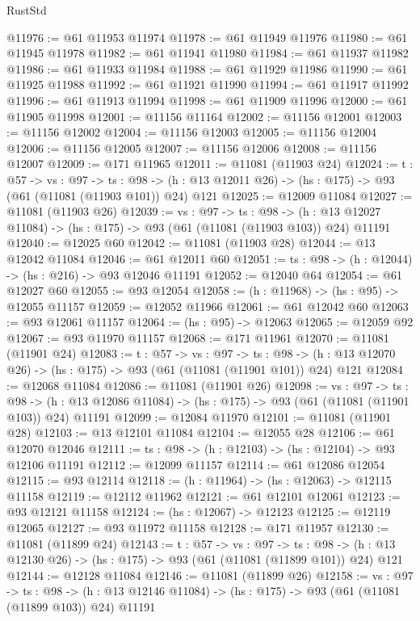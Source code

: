 \begin{lexlean}{RustStd}
\begin{coremodule}
@11976 := @61 @11953 @11974
@11978 := @61 @11949 @11976
@11980 := @61 @11945 @11978
@11982 := @61 @11941 @11980
@11984 := @61 @11937 @11982
@11986 := @61 @11933 @11984
@11988 := @61 @11929 @11986
@11990 := @61 @11925 @11988
@11992 := @61 @11921 @11990
@11994 := @61 @11917 @11992
@11996 := @61 @11913 @11994
@11998 := @61 @11909 @11996
@12000 := @61 @11905 @11998
@12001 := @11156 @11164
@12002 := @11156 @12001
@12003 := @11156 @12002
@12004 := @11156 @12003
@12005 := @11156 @12004
@12006 := @11156 @12005
@12007 := @11156 @12006
@12008 := @11156 @12007
@12009 := @171 @11965
@12011 := @11081 (@11903 @24)
@12024 := {t : @57} ->
  {vs : @97} ->
  {ts : @98} -> (h : @13 @12011 @26) -> (hs : @175) -> @93 (@61 (@11081 (@11903 @101)) @24) @121
@12025 := @12009 @11084
@12027 := @11081 (@11903 @26)
@12039 := {vs : @97} ->
  {ts : @98} ->
  (h : @13 @12027 @11084) -> (hs : @175) -> @93 (@61 (@11081 (@11903 @103)) @24) @11191
@12040 := @12025 @60
@12042 := @11081 (@11903 @28)
@12044 := @13 @12042 @11084
@12046 := @61 @12011 @60
@12051 := {ts : @98} -> (h : @12044) -> (hs : @216) -> @93 @12046 @11191
@12052 := @12040 @64
@12054 := @61 @12027 @60
@12055 := @93 @12054
@12058 := (h : @11968) -> (hs : @95) -> @12055 @11157
@12059 := @12052 @11966
@12061 := @61 @12042 @60
@12063 := @93 @12061 @11157
@12064 := (hs : @95) -> @12063
@12065 := @12059 @92
@12067 := @93 @11970 @11157
@12068 := @171 @11961
@12070 := @11081 (@11901 @24)
@12083 := {t : @57} ->
  {vs : @97} ->
  {ts : @98} -> (h : @13 @12070 @26) -> (hs : @175) -> @93 (@61 (@11081 (@11901 @101)) @24) @121
@12084 := @12068 @11084
@12086 := @11081 (@11901 @26)
@12098 := {vs : @97} ->
  {ts : @98} ->
  (h : @13 @12086 @11084) -> (hs : @175) -> @93 (@61 (@11081 (@11901 @103)) @24) @11191
@12099 := @12084 @11970
@12101 := @11081 (@11901 @28)
@12103 := @13 @12101 @11084
@12104 := @12055 @28
@12106 := @61 @12070 @12046
@12111 := {ts : @98} -> (h : @12103) -> (hs : @12104) -> @93 @12106 @11191
@12112 := @12099 @11157
@12114 := @61 @12086 @12054
@12115 := @93 @12114
@12118 := (h : @11964) -> (hs : @12063) -> @12115 @11158
@12119 := @12112 @11962
@12121 := @61 @12101 @12061
@12123 := @93 @12121 @11158
@12124 := (hs : @12067) -> @12123
@12125 := @12119 @12065
@12127 := @93 @11972 @11158
@12128 := @171 @11957
@12130 := @11081 (@11899 @24)
@12143 := {t : @57} ->
  {vs : @97} ->
  {ts : @98} -> (h : @13 @12130 @26) -> (hs : @175) -> @93 (@61 (@11081 (@11899 @101)) @24) @121
@12144 := @12128 @11084
@12146 := @11081 (@11899 @26)
@12158 := {vs : @97} ->
  {ts : @98} ->
  (h : @13 @12146 @11084) -> (hs : @175) -> @93 (@61 (@11081 (@11899 @103)) @24) @11191

\end{coremodule}
\end{lexlean}
